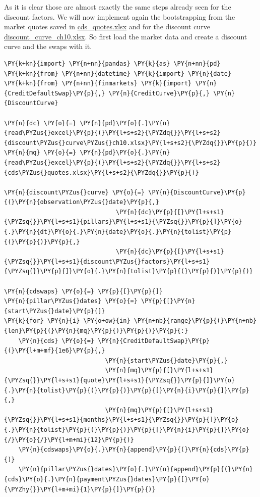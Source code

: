 As it is clear those are almost exactly the same steps already seen for the discount factors.
We will now implement again the bootstrapping from the market quotes saved in \href{https://drive.google.com/file/d/1BOtwCFYk0CUwYkMhnowWTj0HNOpBefd_/view?usp=sharing}{cds\_quotes.xlsx} and for the discount curve \href{https://drive.google.com/file/d/1mugHyet3H9tcSAvYvt8G4_kpfaEbVY7b/view?usp=sharing}{discount\_curve\_ch10.xlsx}.
So first load the market data and create a discount curve and the swaps with it.

\begin{codebox}
\begin{Verbatim}[commandchars=\\\{\}]
\PY{k+kn}{import} \PY{n+nn}{pandas} \PY{k}{as} \PY{n+nn}{pd}
\PY{k+kn}{from} \PY{n+nn}{datetime} \PY{k}{import} \PY{n}{date}
\PY{k+kn}{from} \PY{n+nn}{finmarkets} \PY{k}{import} \PY{n}{CreditDefaultSwap}\PY{p}{,} \PY{n}{CreditCurve}\PY{p}{,} \PY{n}{DiscountCurve}
	
\PY{n}{dc} \PY{o}{=} \PY{n}{pd}\PY{o}{.}\PY{n}{read\PYZus{}excel}\PY{p}{(}\PY{l+s+s2}{\PYZdq{}}\PY{l+s+s2}{discount\PYZus{}curve\PYZus{}ch10.xlsx}\PY{l+s+s2}{\PYZdq{}}\PY{p}{)}
\PY{n}{mq} \PY{o}{=} \PY{n}{pd}\PY{o}{.}\PY{n}{read\PYZus{}excel}\PY{p}{(}\PY{l+s+s2}{\PYZdq{}}\PY{l+s+s2}{cds\PYZus{}quotes.xlsx}\PY{l+s+s2}{\PYZdq{}}\PY{p}{)}
	
\PY{n}{discount\PYZus{}curve} \PY{o}{=} \PY{n}{DiscountCurve}\PY{p}{(}\PY{n}{observation\PYZus{}date}\PY{p}{,}
                               \PY{n}{dc}\PY{p}{[}\PY{l+s+s1}{\PYZsq{}}\PY{l+s+s1}{pillars}\PY{l+s+s1}{\PYZsq{}}\PY{p}{]}\PY{o}{.}\PY{n}{dt}\PY{o}{.}\PY{n}{date}\PY{o}{.}\PY{n}{tolist}\PY{p}{(}\PY{p}{)}\PY{p}{,}
                               \PY{n}{dc}\PY{p}{[}\PY{l+s+s1}{\PYZsq{}}\PY{l+s+s1}{discount\PYZus{}factors}\PY{l+s+s1}{\PYZsq{}}\PY{p}{]}\PY{o}{.}\PY{n}{tolist}\PY{p}{(}\PY{p}{)}\PY{p}{)}
	
\PY{n}{cdswaps} \PY{o}{=} \PY{p}{[}\PY{p}{]}
\PY{n}{pillar\PYZus{}dates} \PY{o}{=} \PY{p}{[}\PY{n}{start\PYZus{}date}\PY{p}{]}
\PY{k}{for} \PY{n}{i} \PY{o+ow}{in} \PY{n+nb}{range}\PY{p}{(}\PY{n+nb}{len}\PY{p}{(}\PY{n}{mq}\PY{p}{)}\PY{p}{)}\PY{p}{:}
    \PY{n}{cds} \PY{o}{=} \PY{n}{CreditDefaultSwap}\PY{p}{(}\PY{l+m+mf}{1e6}\PY{p}{,}
                            \PY{n}{start\PYZus{}date}\PY{p}{,}
                            \PY{n}{mq}\PY{p}{[}\PY{l+s+s1}{\PYZsq{}}\PY{l+s+s1}{quote}\PY{l+s+s1}{\PYZsq{}}\PY{p}{]}\PY{o}{.}\PY{n}{tolist}\PY{p}{(}\PY{p}{)}\PY{p}{[}\PY{n}{i}\PY{p}{]}\PY{p}{,}
                            \PY{n}{mq}\PY{p}{[}\PY{l+s+s1}{\PYZsq{}}\PY{l+s+s1}{months}\PY{l+s+s1}{\PYZsq{}}\PY{p}{]}\PY{o}{.}\PY{n}{tolist}\PY{p}{(}\PY{p}{)}\PY{p}{[}\PY{n}{i}\PY{p}{]}\PY{o}{/}\PY{o}{/}\PY{l+m+mi}{12}\PY{p}{)}
    \PY{n}{cdswaps}\PY{o}{.}\PY{n}{append}\PY{p}{(}\PY{n}{cds}\PY{p}{)}
    \PY{n}{pillar\PYZus{}dates}\PY{o}{.}\PY{n}{append}\PY{p}{(}\PY{n}{cds}\PY{o}{.}\PY{n}{payment\PYZus{}dates}\PY{p}{[}\PY{o}{\PYZhy{}}\PY{l+m+mi}{1}\PY{p}{]}\PY{p}{)}
\end{Verbatim}
\end{codebox}

